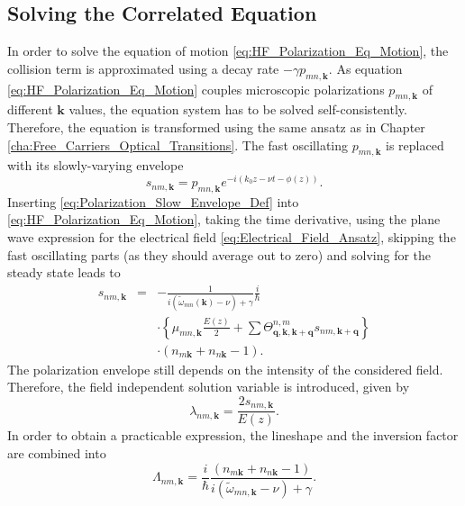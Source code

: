 \subsection{Solving the Correlated Equation}

In order to solve the equation of motion \ref{eq:HF_Polarization_Eq_Motion},
the collision term is approximated using a decay rate $-\gamma p_{mn,\mathbf{k}}$.
As equation \ref{eq:HF_Polarization_Eq_Motion} couples microscopic
polarizations $p_{mn,\mathbf{k}}$ of different $\mathbf{k}$ values,
the equation system has to be solved self-consistently. Therefore,
the equation is transformed using the same ansatz as in Chapter \ref{cha:Free_Carriers_Optical_Transitions}.
The fast oscillating $p_{mn,\mathbf{k}}$ is replaced with its slowly-varying
envelope\begin{equation}
s_{nm,\mathbf{k}}=p_{mn,\mathbf{k}}e^{-i\left(k_{0}z-\nu t-\phi(z)\right)}.\label{eq:Polarization_Slow_Envelope_Def}\end{equation}
Inserting \ref{eq:Polarization_Slow_Envelope_Def} into \ref{eq:HF_Polarization_Eq_Motion},
taking the time derivative, using the plane wave expression for the
electrical field \ref{eq:Electrical_Field_Ansatz}, skipping the fast
oscillating parts (as they should average out to zero) and solving
for the steady state leads to \begin{eqnarray}
s_{nm,\mathbf{k}} & = & -\frac{1}{i\left(\tilde{\omega}_{mn}(\mathbf{k})-\nu\right)+\gamma}\frac{i}{\hbar}\nonumber \\
 &  & \cdot\left\{ \mu_{mn,\mathbf{k}}\frac{E(z)}{2}+\sum\Theta_{\mathbf{q},\mathbf{k},\mathbf{k}+\mathbf{q}}^{n,m}s_{nm,\mathbf{k}+\mathbf{q}}\right\} \label{eq:Polarization_Slow_Envelope_Eq}\\
 &  & \cdot\left(n_{m\mathbf{k}}+n_{n\mathbf{k}}-1\right).\nonumber \end{eqnarray}
The polarization envelope still depends on the intensity of the considered
field. Therefore, the field independent solution variable is introduced,
given by\begin{equation}
\lambda_{nm,\mathbf{k}}=\frac{2s_{nm,\mathbf{k}}}{E(z)}.\label{eq:Field_Independent_Sol_Var}\end{equation}
In order to obtain a practicable expression, the lineshape and the
inversion factor are combined into\begin{equation}
\Lambda_{nm,\mathbf{k}}=\frac{i}{\hbar}\frac{\left(n_{m\mathbf{k}}+n_{n\mathbf{k}}-1\right)}{i\left(\tilde{\omega}_{mn,\mathbf{k}}-\nu\right)+\gamma}.\label{eq:Lineshape_Inversion_Factor}\end{equation}

